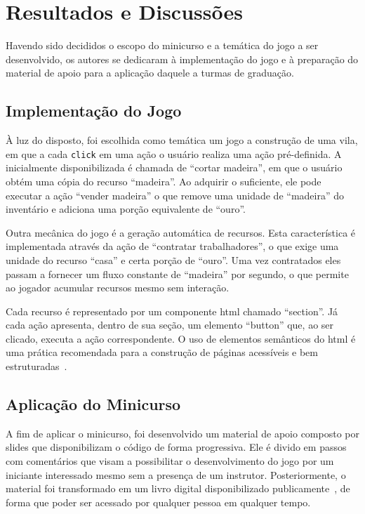 \section{Resultados e Discussões}%
\label{sec:resultados}%

Havendo sido decididos o escopo do minicurso e a temática do jogo a ser desenvolvido, os autores se dedicaram à implementação do jogo e à preparação do material de apoio para a aplicação daquele a turmas de graduação.

\subsection{Implementação do Jogo}

À luz do disposto, foi escolhida como temática um jogo a construção de uma vila, em que a cada \texttt{click} em uma ação o usuário realiza uma ação pré-definida.
A inicialmente disponibilizada é chamada de ``cortar madeira'', em que o usuário obtém uma cópia do recurso ``madeira''.
Ao adquirir o suficiente, ele pode executar a ação ``vender madeira''
o que remove uma unidade de ``madeira'' do inventário e adiciona uma porção equivalente de ``ouro''.

Outra mecânica do jogo é a geração automática de recursos. Esta característica é implementada através da ação de ``contratar trabalhadores'', o que exige uma unidade do recurso ``casa'' e certa porção de ``ouro''.
Uma vez contratados eles passam a fornecer um fluxo constante de ``madeira'' por segundo, o que permite ao jogador acumular recursos mesmo sem interação.

Cada recurso é representado por um componente \gls{html} chamado ``section''.
Já cada ação apresenta, dentro de sua seção, um elemento ``button'' que, ao ser clicado, executa a ação correspondente.
O uso de elementos semânticos do \gls{html} é uma prática recomendada para a construção de páginas acessíveis e bem estruturadas~\cite{whatwg:2025:html_standard_semantics}.

\subsection{Aplicação do Minicurso}

A fim de aplicar o minicurso, foi desenvolvido um material de apoio composto por slides que disponibilizam o código de forma progressiva.
Ele é divido em passos com comentários que visam a possibilitar o desenvolvimento do jogo por um iniciante interessado mesmo sem a presença de um instrutor.
Posteriormente, o material foi transformado em um livro digital disponibilizado publicamente~\cite{malosto:2024:comecando_no_react}, de forma que poder ser acessado por qualquer pessoa em qualquer tempo.

